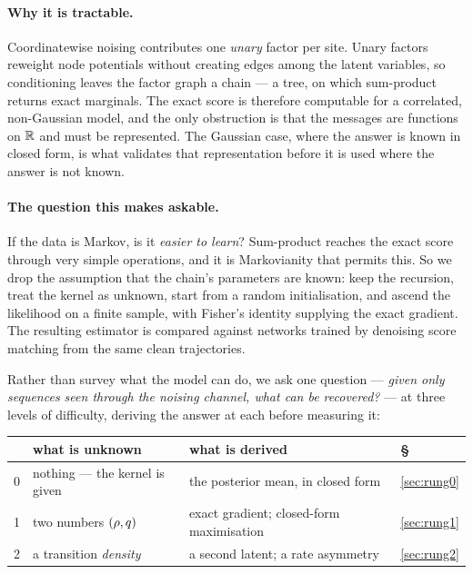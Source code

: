 \documentclass{article}
\theoremstyle{definition}
\theoremstyle{plain}
\begin{document}
\paragraph{Why it is tractable.} Coordinatewise noising contributes one \emph{unary} factor per
site. Unary factors reweight node potentials without creating edges among the latent variables, so
conditioning leaves the factor graph a chain --- a tree, on which sum-product returns exact
marginals. The exact score is therefore computable for a correlated, non-Gaussian model, and the
only obstruction is that the messages are functions on $\mathbb{R}$ and must be represented. The
Gaussian case, where the answer is known in closed form, is what validates that representation
before it is used where the answer is not known.

\paragraph{The question this makes askable.} If the data is Markov, is it \emph{easier to learn}?
Sum-product reaches the exact score through very simple operations, and it is Markovianity that
permits this. So we drop the assumption that the chain's parameters are known: keep the recursion,
treat the kernel as unknown, start from a random initialisation, and ascend the likelihood on a
finite sample, with Fisher's identity supplying the exact gradient. The resulting estimator is
compared against networks trained by denoising score matching from the same clean trajectories.

Rather than survey what the model can do, we ask one question --- \emph{given only sequences seen
through the noising channel, what can be recovered?} --- at three levels of difficulty, deriving
the answer at each before measuring it:

\begin{center}\small
\begin{tabular}{@{}clll@{}}
\toprule
 & what is unknown & what is derived & \S \\
\midrule
0 & nothing --- the kernel is given & the posterior mean, in closed form & \ref{sec:rung0} \\
1 & two numbers $(\rho,q)$ & exact gradient; closed-form maximisation & \ref{sec:rung1} \\
2 & a transition \emph{density} & a second latent; a rate asymmetry & \ref{sec:rung2} \\
\bottomrule
\end{tabular}
\end{center}
\end{document}
